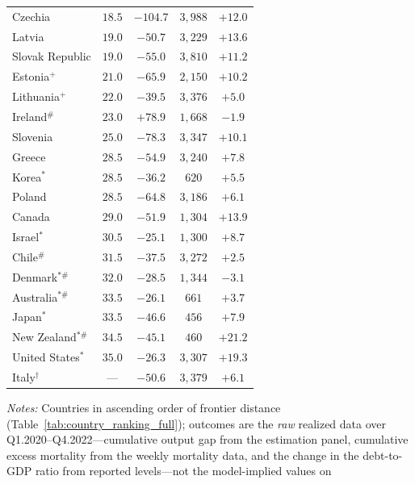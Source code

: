 \documentclass[12pt, a4paper]{article}
\begin{document}
\begin{table}[H]
\begin{tabular}{lc ccc}
Czechia                 & $18.5$ & $-104.7$ & $3{,}988$ & $+12.0$ \\
Latvia                  & $19.0$ & $-50.7$  & $3{,}229$ & $+13.6$ \\
Slovak Republic         & $19.0$ & $-55.0$  & $3{,}810$ & $+11.2$ \\
Estonia\(^{+}\)         & $21.0$ & $-65.9$  & $2{,}150$ & $+10.2$ \\
Lithuania\(^{+}\)       & $22.0$ & $-39.5$  & $3{,}376$ & $+5.0$  \\
Ireland\(^{\#}\)        & $23.0$ & $+78.9$  & $1{,}668$ & $-1.9$  \\
Slovenia                & $25.0$ & $-78.3$  & $3{,}347$ & $+10.1$ \\
Greece                  & $28.5$ & $-54.9$  & $3{,}240$ & $+7.8$  \\
Korea\(^{*}\)           & $28.5$ & $-36.2$  & $620$     & $+5.5$  \\
Poland                  & $28.5$ & $-64.8$  & $3{,}186$ & $+6.1$  \\
Canada                  & $29.0$ & $-51.9$  & $1{,}304$ & $+13.9$ \\
Israel\(^{*}\)          & $30.5$ & $-25.1$  & $1{,}300$ & $+8.7$  \\
Chile\(^{\#}\)          & $31.5$ & $-37.5$  & $3{,}272$ & $+2.5$  \\
Denmark\(^{*\#}\)       & $32.0$ & $-28.5$  & $1{,}344$ & $-3.1$  \\
Australia\(^{*\#}\)     & $33.5$ & $-26.1$  & $661$     & $+3.7$  \\
Japan\(^{*}\)           & $33.5$ & $-46.6$  & $456$     & $+7.9$  \\
New Zealand\(^{*\#}\)   & $34.5$ & $-45.1$  & $460$     & $+21.2$ \\
United States\(^{*}\)   & $35.0$ & $-26.3$  & $3{,}307$ & $+19.3$ \\
\midrule
Italy\(^{\dagger}\)     & ---    & $-50.6$  & $3{,}379$ & $+6.1$  \\
\bottomrule
\end{tabular}
\vspace{0.15cm}
\begin{minipage}{0.95\textwidth}
\scriptsize \textit{Notes:} Countries in ascending order of frontier distance
(Table~\ref{tab:country_ranking_full}); outcomes are the \emph{raw} realized
data over Q1.2020--Q4.2022---cumulative output gap from the estimation panel,
cumulative excess mortality from the weekly mortality data, and the change in
the debt-to-GDP ratio from reported levels---not the model-implied values on

\end{minipage}
\end{table}
\end{document}
